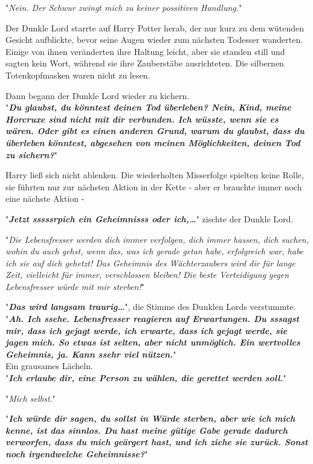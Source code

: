 {"\emph{Nein. Der Schwur zwingt mich zu keiner possitiven Handlung.}"

Der Dunkle Lord starrte auf Harry Potter herab, der nur kurz zu dem wütenden Gesicht aufblickte, bevor seine Augen wieder zum nächsten Todesser wanderten.\\ Einige von ihnen veränderten ihre Haltung leicht, aber sie standen still und sagten kein Wort, während sie ihre Zauberstäbe ausrichteten. Die silbernen Totenkopfmasken waren nicht zu lesen.

Dann begann der Dunkle Lord wieder zu kichern.\\ "\textbf{\emph{Du glaubst, du könntest deinen Tod überleben? Nein, Kind, meine Horcruxe sind nicht mit dir verbunden. Ich wüsste, wenn sie es wären. Oder gibt es einen anderen Grund, warum du glaubst, dass du überleben könntest, abgesehen von meinen Möglichkeiten, deinen Tod zu sichern?}}"

Harry ließ sich nicht ablenken. Die wiederholten Misserfolge spielten keine Rolle, sie führten nur zur nächsten Aktion in der Kette - aber er brauchte immer noch eine nächste Aktion -

"\textbf{\emph{Jetzt sssssrpich ein Geheimnisss oder ich,…}}" zischte der Dunkle Lord.

"\emph{Die Lebensfresser werden dich immer verfolgen, dich immer hassen, dich suchen, wohin du auch gehst, wenn das, was ich gerade getan habe, erfolgreich war, habe ich sie auf dich gehetzt! Das Geheimnis des Wächterzaubers wird dir für lange Zeit, vielleicht für immer, verschlossen bleiben! Die beste Verteidigung gegen Lebensfresser würde mit mir sterben!}"

"\textbf{\emph{Das wird langsam traurig…}}", die Stimme des Dunklen Lords verstummte.\\ "\textbf{\emph{Ah. Ich ssehe. Lebensfresser reagieren auf Erwartungen. Du sssagst mir, dass ich gejagt werde, ich erwarte, dass ich gejagt werde, sie jagen mich. So etwas ist selten, aber nicht unmöglich. Ein wertvolles Geheimnis, ja. Kann ssehr viel nützen.}}"\\ Ein grausames Lächeln.\\ "\textbf{\emph{Ich erlaube dir, eine Person zu wählen, die gerettet werden soll.}}"

"\emph{Mich selbst.}"

"\textbf{\emph{Ich würde dir sagen, du sollst in Würde sterben, aber wie ich mich kenne, ist das sinnlos. Du hast meine gütige Gabe gerade dadurch verworfen, dass du mich geärgert hast, und ich ziehe sie zurück. Sonst noch irgendwelche Geheimnisse?}}"

}
